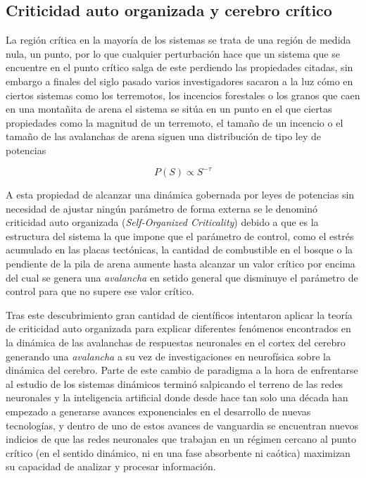 \documentclass[11pt,a4paper,twoside,pdf]{article}
\begin{document}
\subsection{Criticidad auto organizada y cerebro crítico}

La región crítica en la mayoría de los sistemas se trata de una región de medida nula, un punto, por lo que cualquier perturbación hace que un sistema que se encuentre en el punto crítico salga de este perdiendo las propiedades citadas, sin embargo a finales del siglo pasado varios investigadores \cite{bak1987} sacaron a la luz cómo en ciertos sistemas como los terremotos, los incencios forestales o los granos que caen en una montañita de arena el sistema se sitúa en un punto en el que ciertas propiedades como la magnitud de un terremoto, el tamaño de un incencio o el tamaño de las avalanchas de arena siguen una distribución de tipo ley de potencias

\begin{equation}
  P(S) \propto S^{-\tau}
\end{equation}

A esta propiedad de alcanzar una dinámica gobernada por leyes de potencias sin necesidad de ajustar ningún parámetro de forma externa se le denominó criticidad auto organizada (\emph{Self-Organized Criticality}) debido a que es la estructura del sistema la que impone que el parámetro de control, como el estrés acumulado en las placas tectónicas, la cantidad de combustible en el bosque o la pendiente de la pila de arena aumente hasta alcanzar un valor crítico por encima del cual se genera una \emph{avalancha} en setido general que disminuye el parámetro de control para que no supere ese valor crítico.

Tras este descubrimiento gran cantidad de científicos intentaron aplicar la teoría de criticidad auto organizada para explicar diferentes fenómenos encontrados en la dinámica de las avalanchas de respuestas neuronales en el cortex del cerebro \cite{beggs2003} generando una \emph{avalancha} a su vez de investigaciones en neurofísica sobre la dinámica del cerebro. Parte de este cambio de paradigma a la hora de enfrentarse al estudio de los sistemas dinámicos terminó salpicando el terreno de las redes neuronales y la inteligencia artificial donde desde hace tan solo una década han empezado a generarse avances exponenciales en el desarrollo de nuevas tecnologías, y dentro de uno de estos avances de vanguardia se encuentran nuevos indicios de que las redes neuronales que trabajan en un régimen cercano al punto crítico (en el sentido dinámico, ni en una fase absorbente ni caótica) maximizan su capacidad de analizar y procesar información.
\end{document}
